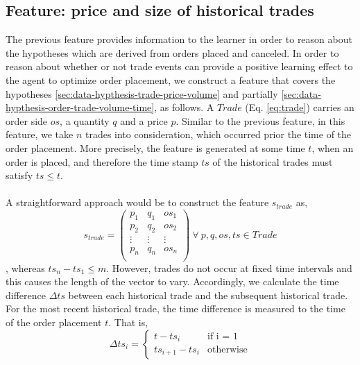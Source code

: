 \subsection{Feature: price and size of historical trades}
\label{sec:data-feature-2}
The previous feature provides information to the learner in order to reason about the hypotheses which are derived from orders placed and canceled.
In order to reason about whether or not trade events can provide a positive learning effect to the agent to optimize order placement, we construct a feature that covers the hypotheses \ref{sec:data-hypthesis-trade-price-volume} and partially \ref{sec:data-hypthesis-order-trade-volume-time}, as follows.
A $Trade$ (Eq. \ref{eq:trade}) carries an order side $os$, a quantity $q$ and a price $p$.
Similar to the previous feature, in this feature, we take $n$ trades into consideration, which occurred prior the time of the order placement.
More precisely, the feature is generated at some time $t$, when an order is placed, and therefore the time stamp $ts$ of the historical trades must satisfy $ts \leq t$.
\\
\\
A straightforward approach would be to construct the feature $s_{trade}$ as,
\begin{equation}
    s_{trade} =\begin{pmatrix}
        p_1 & q_1 & os_1 \\
        p_2 & q_2 & os_2 \\
        \vdots & \vdots & \vdots\\
        p_n & q_n & os_n \\
    \end{pmatrix}
    \ \forall \ p, q, os, ts \in Trade
\end{equation}, whereas $ts_n - ts_1 \leq m$.
However, trades do not occur at fixed time intervals and this causes the length of the vector to vary.
Accordingly, we calculate the time difference $\Delta{ts}$ between each historical trade and the subsequent historical trade.
For the most recent historical trade, the time difference is measured to the time of the order placement $t$.
That is,
\begin{equation}
    \Delta{ts}_i = \begin{cases}
    t - ts_i &\text{if i = 1}\\
    ts_{i+1} - ts_i &\text{otherwise}
    \end{cases}
\end{equation}


